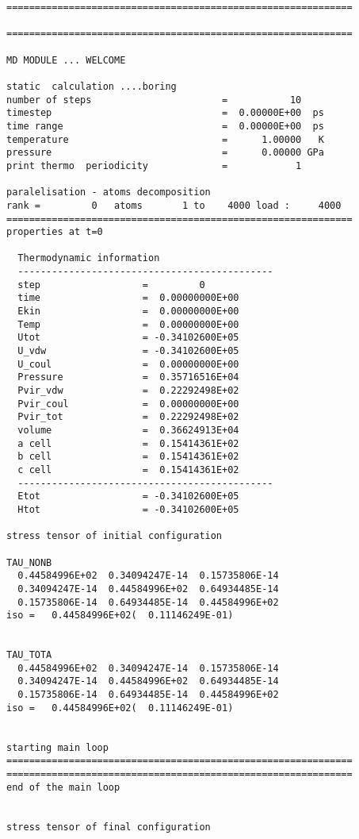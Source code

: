\documentclass[a4paper,8pt]{article}
\begin{document}
\begin{verbatim}
=============================================================

=============================================================

MD MODULE ... WELCOME

static  calculation ....boring                 
number of steps                       =           10
timestep                              =  0.00000E+00  ps
time range                            =  0.00000E+00  ps
temperature                           =      1.00000   K
pressure                              =      0.00000 GPa
print thermo  periodicity             =            1

paralelisation - atoms decomposition
rank =         0   atoms       1 to    4000 load :     4000
=============================================================
properties at t=0

  Thermodynamic information 
  ---------------------------------------------
  step                  =         0
  time                  =  0.00000000E+00
  Ekin                  =  0.00000000E+00
  Temp                  =  0.00000000E+00
  Utot                  = -0.34102600E+05
  U_vdw                 = -0.34102600E+05
  U_coul                =  0.00000000E+00
  Pressure              =  0.35716516E+04
  Pvir_vdw              =  0.22292498E+02
  Pvir_coul             =  0.00000000E+00
  Pvir_tot              =  0.22292498E+02
  volume                =  0.36624913E+04
  a cell                =  0.15414361E+02
  b cell                =  0.15414361E+02
  c cell                =  0.15414361E+02
  ---------------------------------------------
  Etot                  = -0.34102600E+05
  Htot                  = -0.34102600E+05

stress tensor of initial configuration

TAU_NONB
  0.44584996E+02  0.34094247E-14  0.15735806E-14
  0.34094247E-14  0.44584996E+02  0.64934485E-14
  0.15735806E-14  0.64934485E-14  0.44584996E+02
iso =   0.44584996E+02(  0.11146249E-01)


TAU_TOTA
  0.44584996E+02  0.34094247E-14  0.15735806E-14
  0.34094247E-14  0.44584996E+02  0.64934485E-14
  0.15735806E-14  0.64934485E-14  0.44584996E+02
iso =   0.44584996E+02(  0.11146249E-01)


starting main loop
=============================================================
=============================================================
end of the main loop


stress tensor of final configuration


\end{verbatim}
\end{document}
